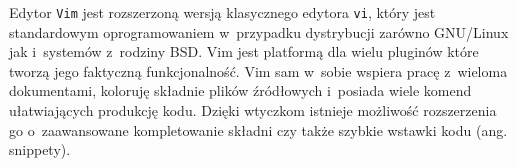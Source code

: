 \par
Edytor \texttt{Vim} jest rozszerzoną wersją klasycznego edytora \texttt{vi}, który jest standardowym oprogramowaniem w~przypadku dystrybucji zarówno GNU/Linux jak i~systemów z~rodziny BSD. Vim jest platformą dla wielu pluginów które tworzą jego faktyczną funkcjonalność. Vim sam w~sobie wspiera pracę z~wieloma dokumentami, koloruję składnie plików źródłowych i~posiada wiele komend ułatwiających produkcję kodu. Dzięki wtyczkom istnieje możliwość rozszerzenia go o~zaawansowane kompletowanie składni czy także szybkie wstawki kodu (ang. snippety).

\clearpage
